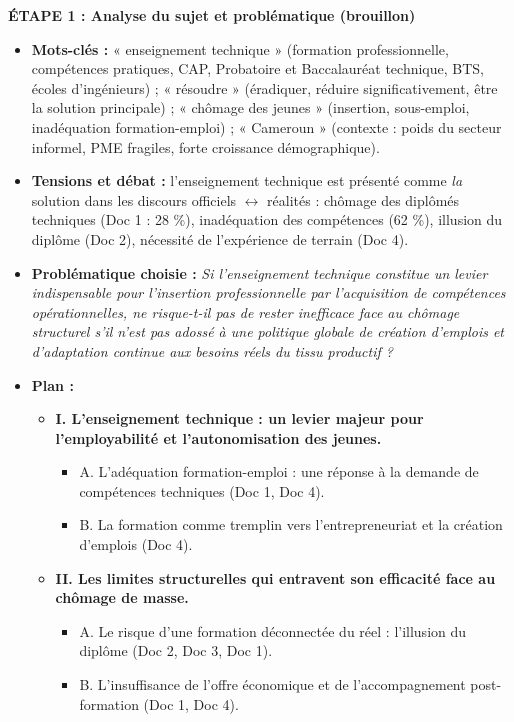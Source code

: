 \documentclass[11pt]{article}
\newcounter{popsec}
\newcounter{popsub}
\newcommand{\courssub}[1]{%
  \stepcounter{popsub}%
  \par\vspace{9pt}\noindent{\popxbold\fontsize{11.5}{13}\selectfont\color{popink}{\color{poporange}\thepopsec.\thepopsub}\hspace{6pt}#1}\par\nopagebreak\vspace{4pt}
}
\begin{document}
\courssub{Démarche et corrigé commenté}
\begin{exoresolu}
\textbf{ÉTAPE 1 : Analyse du sujet et problématique (brouillon)}

\begin{itemize}
    \item \textbf{Mots-clés :} « enseignement technique » (formation professionnelle, compétences pratiques, CAP, Probatoire et Baccalauréat technique, BTS, écoles d'ingénieurs) ; « résoudre » (éradiquer, réduire significativement, être la solution principale) ; « chômage des jeunes » (insertion, sous-emploi, inadéquation formation-emploi) ; « Cameroun » (contexte : poids du secteur informel, PME fragiles, forte croissance démographique).
    \item \textbf{Tensions et débat :} l'enseignement technique est présenté comme \emph{la} solution dans les discours officiels $\leftrightarrow$ réalités : chômage des diplômés techniques (Doc 1 : 28 \%), inadéquation des compétences (62 \%), illusion du diplôme (Doc 2), nécessité de l'expérience de terrain (Doc 4).
    \item \textbf{Problématique choisie :} \emph{Si l'enseignement technique constitue un levier indispensable pour l'insertion professionnelle par l'acquisition de compétences opérationnelles, ne risque-t-il pas de rester inefficace face au chômage structurel s'il n'est pas adossé à une politique globale de création d'emplois et d'adaptation continue aux besoins réels du tissu productif ?}
    \item \textbf{Plan :}
    \begin{itemize}
        \item \textbf{I. L'enseignement technique : un levier majeur pour l'employabilité et l'autonomisation des jeunes.}
        \begin{itemize}
            \item A. L'adéquation formation-emploi : une réponse à la demande de compétences techniques (Doc 1, Doc 4).
            \item B. La formation comme tremplin vers l'entrepreneuriat et la création d'emplois (Doc 4).
        \end{itemize}
        \item \textbf{II. Les limites structurelles qui entravent son efficacité face au chômage de masse.}
        \begin{itemize}
            \item A. Le risque d'une formation déconnectée du réel : l'illusion du diplôme (Doc 2, Doc 3, Doc 1).
            \item B. L'insuffisance de l'offre économique et de l'accompagnement post-formation (Doc 1, Doc 4).
        \end{itemize}
    \end{itemize}
\end{itemize}


\end{exoresolu}
\end{document}
